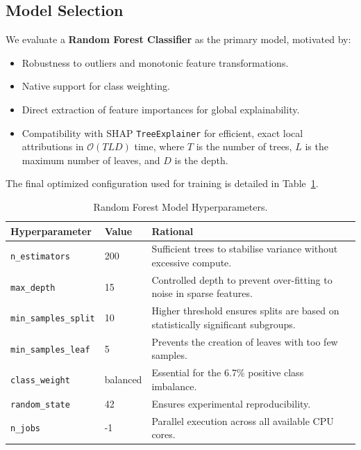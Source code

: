 \documentclass[11pt,a4paper]{article}
\begin{document}
\subsection{Model Selection}

We evaluate a \textbf{Random Forest Classifier} as the primary model, motivated by:
\begin{itemize}
    \item Robustness to outliers and monotonic feature transformations.
    \item Native support for class weighting.
    \item Direct extraction of feature importances for global explainability.
    \item Compatibility with SHAP \texttt{TreeExplainer} for efficient, exact local
          attributions in $\mathcal{O}(TLD)$ time, where $T$ is the number of trees,
          $L$ is the maximum number of leaves, and $D$ is the depth.
\end{itemize}

The final optimized configuration used for training is detailed in 
Table~\ref{tab:hyperparams}.

\begin{table}[htbp]
\centering
\caption{Random Forest Model Hyperparameters.}
\label{tab:hyperparams}
\begin{tabular}{llp{8cm}}
\toprule
\textbf{Hyperparameter} & \textbf{Value} & \textbf{Rational} \\
\midrule
\texttt{n\_estimators}      & 200      & Sufficient trees to stabilise variance without excessive compute. \\
\texttt{max\_depth}        & 15       & Controlled depth to prevent over-fitting to noise in sparse features. \\
\texttt{min\_samples\_split} & 10       & Higher threshold ensures splits are based on statistically significant subgroups. \\
\texttt{min\_samples\_leaf}  & 5        & Prevents the creation of leaves with too few samples. \\
\texttt{class\_weight}      & balanced & Essential for the 6.7\% positive class imbalance. \\
\texttt{random\_state}      & 42       & Ensures experimental reproducibility. \\
\texttt{n\_jobs}            & -1       & Parallel execution across all available CPU cores. \\
\bottomrule
\end{tabular}
\end{table}
\end{document}
